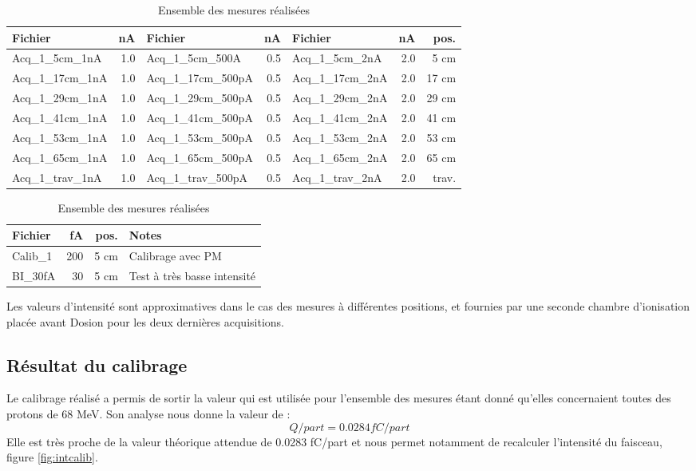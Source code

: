 \documentclass[a4paper,11pt]{article}
\begin{document}
\begin{table}[h]
\begin{center}
\begin{tabular}{lr|lr|lr|r}
Fichier&nA&Fichier&nA&Fichier&nA&pos.\\
\hline
\hline
Acq\_1\_5cm\_1nA&1.0&Acq\_1\_5cm\_500A&0.5&Acq\_1\_5cm\_2nA&2.0&5 cm\\
Acq\_1\_17cm\_1nA&1.0&Acq\_1\_17cm\_500pA&0.5&Acq\_1\_17cm\_2nA&2.0&17 cm\\
Acq\_1\_29cm\_1nA&1.0&Acq\_1\_29cm\_500pA&0.5&Acq\_1\_29cm\_2nA&2.0&29 cm\\
Acq\_1\_41cm\_1nA&1.0&Acq\_1\_41cm\_500pA&0.5&Acq\_1\_41cm\_2nA&2.0&41 cm\\
Acq\_1\_53cm\_1nA&1.0&Acq\_1\_53cm\_500pA&0.5&Acq\_1\_53cm\_2nA&2.0&53 cm\\
Acq\_1\_65cm\_1nA&1.0&Acq\_1\_65cm\_500pA&0.5&Acq\_1\_65cm\_2nA&2.0&65 cm\\
Acq\_1\_trav\_1nA&1.0&Acq\_1\_trav\_500pA&0.5&Acq\_1\_trav\_2nA&2.0&trav.\\
\hline
\end{tabular}

\vspace{2ex}
\begin{tabular}{lrrl}
Fichier&fA&pos.&Notes\\
\hline
\hline
Calib\_1&200&5 cm&Calibrage avec PM\\
BI\_30fA&30&5 cm&Test à très basse intensité\\
\hline
\end{tabular}
\caption{\label{tab:bilan}\footnotesize{Ensemble des mesures réalisées}}
\end{center}
\end{table}

Les valeurs d'intensité sont approximatives dans le cas des mesures à différentes positions, et fournies par une seconde chambre d'ionisation placée avant Dosion pour les deux dernières acquisitions.

\subsection*{Résultat du calibrage}
Le calibrage réalisé a permis de sortir la valeur qui est utilisée pour l'ensemble des mesures étant donné qu'elles concernaient toutes des protons de 68 MeV.
Son analyse nous donne la valeur de :
$$Q/part = 0.0284 fC/part$$
Elle est très proche de la valeur théorique attendue de 0.0283 fC/part et nous permet notamment de recalculer l'intensité du faisceau, figure \ref{fig:intcalib}.
\end{document}
